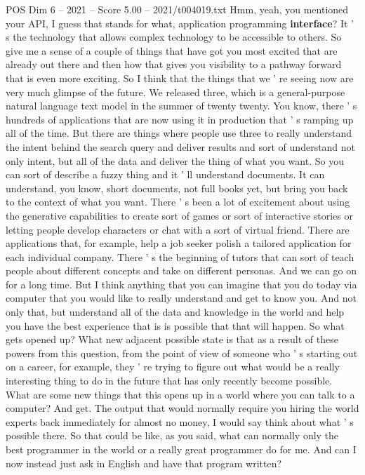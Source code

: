 \begin{textsample}{POS Dim 6 – 2021 – Score 5.00 – 2021/t004019.txt}
Hmm, yeah, you mentioned your API, I guess that stands for what, application programming \textbf{interface}?
It ' s the technology that allows complex technology to be accessible to others.
So give me a sense of a couple of things that have got you most excited that are already out there and then how that gives you visibility to a pathway forward that is even more exciting.
So I think that the things that we ' re seeing now are very much glimpse of the future.
We released three, which is a general-purpose natural language text model in the summer of twenty twenty.
You know, there ' s hundreds of applications that are now using it in production that ' s ramping up all of the time.
But there are things where people use three to really understand the intent behind the search query and deliver results and sort of understand not only intent, but all of the data and deliver the thing of what you want.
So you can sort of describe a fuzzy thing and it ' ll understand documents.
It can understand, you know, short documents, not full books yet, but bring you back to the context of what you want.
There ' s been a lot of excitement about using the generative capabilities to create sort of games or sort of interactive stories or letting people develop characters or chat with a sort of virtual friend.
There are applications that, for example, help a job seeker polish a tailored application for each individual company.
There ' s the beginning of tutors that can sort of teach people about different concepts and take on different personas.
And we can go on for a long time.
But I think anything that you can imagine that you do today via computer that you would like to really understand and get to know you.
And not only that, but understand all of the data and knowledge in the world and help you have the best experience that is is possible that that will happen.
So what gets opened up?
What new adjacent possible state is that as a result of these powers from this question, from the point of view of someone who ' s starting out on a career, for example, they ' re trying to figure out what would be a really interesting thing to do in the future that has only recently become possible.
What are some new things that this opens up in a world where you can talk to a computer?
And get.
The output that would normally require you hiring the world experts back immediately for almost no money, I would say think about what ' s possible there.
So that could be like, as you said, what can normally only the best programmer in the world or a really great programmer do for me.
And can I now instead just ask in English and have that program written?

\end{textsample}
